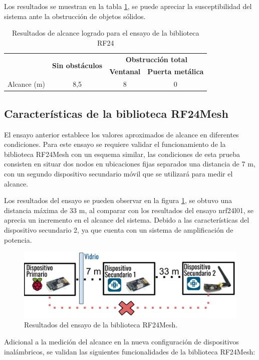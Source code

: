 Los resultados se muestran en la tabla \ref{tab:tabla_1}, se puede apreciar la susceptibilidad del sistema ante la obstrucción de objetos sólidos.

\begin{table}[h]
\centering
\caption[Resultados ensayo biblioteca RF24]{Resultados de alcance logrado para el ensayo de la biblioteca RF24}
\begin{tabular}{lccc}
\toprule
\textbf{}                       & \multirow{2}{*}{\textbf{Sin obstáculos}} & \multicolumn{2}{c}{\textbf{Obstrucción total}} \\
\textbf{}                       &                                          & \textbf{Ventanal}  & \textbf{Puerta metálica}  \\
\midrule
\multicolumn{1}{c}{Alcance (m)} & 8,5                                      & 8                  & 0                        
\\
\bottomrule
\hline                                                                        
\end{tabular}
\label{tab:tabla_1}
\end{table}


\subsection{Características de la biblioteca RF24Mesh}

El ensayo anterior establece los valores aproximados de alcance en diferentes condiciones. Para este ensayo se requiere validar el funcionamiento de la biblioteca RF24Mesh con un esquema similar, las condiciones de esta prueba consisten en situar dos nodos en ubicaciones fijas separados una distancia de 7 m, con un segundo dispositivo secundario móvil que se utilizará para medir el alcance.

Los resultados del ensayo se pueden observar en la figura \ref{fig:figura_d}, se obtuvo una distancia máxima de 33 m, al comparar con los resultados del ensayo nrf24l01, se aprecia un incremento en el alcance del sistema. Debido a las características del dispositivo secundario 2, ya que cuenta con un sistema de amplificación de potencia.

\begin{figure}[ht]
	\centering
	\includegraphics[scale=.3]{./Figures/Capitulo4/Figura_D.png}
	\caption{Resultados del ensayo de la biblioteca RF24Mesh.}
	\label{fig:figura_d}
\end{figure}
\break
Adicional a la medición del alcance en la nueva configuración de dispositivos inalámbricos, se validan las siguientes funcionalidades de la biblioteca RF24Mesh:


